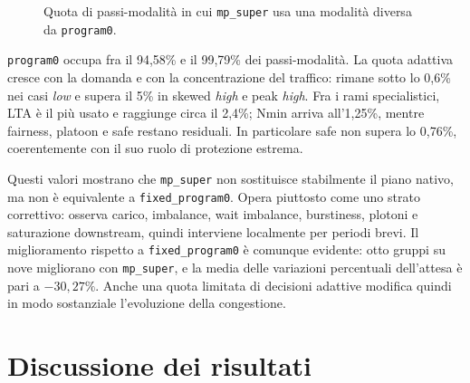 \documentclass[12pt,a4paper,oneside]{report}
\numberwithin{equation}{chapter}
\begin{document}
\begin{figure}[htbp]
    \centering
    \caption{Quota di passi-modalità in cui \texttt{mp\_super} usa una
    modalità diversa da \texttt{program0}.}
    \label{fig:super-non-program0}
\end{figure}

\texttt{program0} occupa fra il 94,58\% e il 99,79\% dei passi-modalità.
La quota adattiva cresce con la domanda e con la concentrazione del traffico:
rimane sotto lo 0,6\% nei casi \emph{low} e supera il 5\% in skewed \emph{high} e peak
\emph{high}. Fra i rami specialistici, LTA è il più usato e raggiunge circa il 2,4\%;
Nmin arriva all'1,25\%, mentre fairness, platoon e safe restano residuali. In
particolare safe non supera lo 0,76\%, coerentemente con il suo ruolo di
protezione estrema.

Questi valori mostrano che \texttt{mp\_super} non sostituisce stabilmente il
piano nativo, ma non è equivalente a \texttt{fixed\_program0}. Opera piuttosto
come uno strato correttivo: osserva carico, imbalance, wait imbalance,
burstiness, plotoni e saturazione downstream, quindi interviene localmente per
periodi brevi. Il miglioramento rispetto a \texttt{fixed\_program0} è comunque
evidente: otto gruppi su nove migliorano con \texttt{mp\_super}, e la media
delle variazioni percentuali dell'attesa è pari a \(-30{,}27\%\). Anche una
quota limitata di decisioni adattive modifica quindi in modo sostanziale
l'evoluzione della congestione.

\section{Discussione dei risultati}
\end{document}
